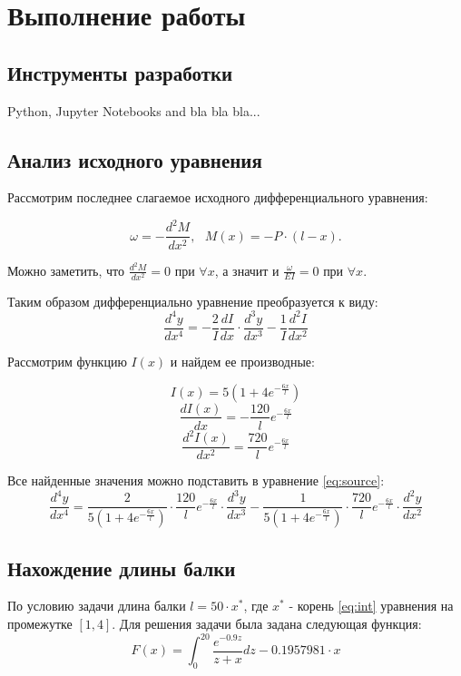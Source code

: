 \section{Выполнение работы}

\subsection{Инструменты разработки}

Python, Jupyter Notebooks and bla bla bla...

\subsection{Анализ исходного уравнения}

Рассмотрим последнее слагаемое исходного дифференциального уравнения:

\[
	\omega = -\frac{d^2M}{dx^2},\ \ \ M(x) = -P \cdot (l - x).
\]

Можно заметить, что $\frac{d^2M}{dx^2} = 0$ при $\forall x$, а значит и $\frac{\omega}{EI} = 0$ при $\forall x$.

Таким образом дифференциально уравнение преобразуется к виду:
\begin{equation}\label{eq:source}
	\frac{d^4y}{dx^4} = - \frac{2}{I} \frac{dI}{dx}\cdot \frac{d^3y}{dx^3} - \frac{1}{I} \frac{d^2I}{dx^2}
\end{equation}

Рассмотрим функцию $I(x)$ и найдем ее производные:
\begin{multicols}{3}
\noindent
\[
	I(x) = 5(1 + 4e^{-\frac{6x}{l}})
\]
\[
	\frac{dI(x)}{dx} = -\frac{120}{l}e^{-\frac{6x}{l}}
\]
\[
	\frac{d^2I(x)}{dx^2} = \frac{720}{l}e^{-\frac{6x}{l}}
\]
\end{multicols}

Все найденные значения можно подставить в уравнение \ref{eq:source}:
\begin{equation}
\frac{d^4y}{dx^4} = \frac{2}{5(1 + 4e^{-\frac{6x}{l}})} \cdot \frac{120}{l}e^{-\frac{6x}{l}} \cdot \frac{d^3y}{dx^3} - 
\frac{1}{5(1 + 4e^{-\frac{6x}{l}})} \cdot \frac{720}{l}e^{-\frac{6x}{l}} \cdot \frac{d^2y}{dx^2}
\end{equation}

\subsection{Нахождение длины балки}

По условию задачи длина балки $l = 50\cdot x^*$, где $x^*$ - корень \ref{eq:int} уравнения на промежутке $[1, 4]$. Для решения задачи была задана следующая функция:
\begin{equation}
F(x) = \int_0^{20} \frac{e^{-0.9z}}{z+x}dz - 0.1957981\cdot x
\end{equation}

